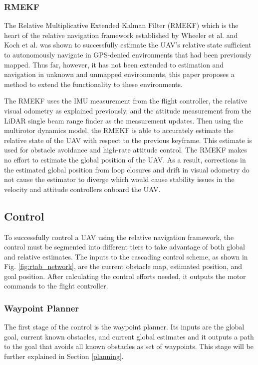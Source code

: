 \documentclass[letterpaper, 10 pt, conference]{ieeeconf}  %
\begin{document}
\subsubsection{RMEKF}

The Relative Multiplicative Extended Kalman Filter (RMEKF) which is the heart of the relative navigation framework established by Wheeler et al. \cite{Wheeler2017}\cite{Wheeler2018} and Koch et al. \cite{Koch2017} was shown to successfully estimate the UAV's relative state sufficient to autonomously navigate in GPS-denied environments that had been previously mapped. Thus far, however, it has not been extended to estimation and navigation in unknown and unmapped environments, this paper proposes a method to extend the functionality to these environments.

The RMEKF uses the IMU measurement from the flight controller, the relative visual odometry as explained previously, and the attitude measurement from the LiDAR single beam range finder as the measurement updates. Then using the multirotor dynamics model, the RMEKF is able to accurately estimate the relative state of the UAV with respect to the previous keyframe. This estimate is used for obstacle avoidance and high-rate attitude control. The RMEKF makes no effort to estimate the global position of the UAV. As a result, corrections in the estimated global position from loop closures and drift in visual odometry do not cause the estimator to diverge which would cause stability issues in the velocity and attitude controllers onboard the UAV.

\subsection{Control}

To successfully control a UAV using the relative navigation framework, the control must be segmented into different tiers to take advantage of both global and relative estimates. The inputs to the cascading control scheme, as shown in Fig. \ref{fig:rtab_network}, are the current obstacle map, estimated position, and goal position. After calculating the control efforts needed, it outputs the motor commands to the flight controller.

\subsubsection{Waypoint Planner}

The first stage of the control is the waypoint planner. Its inputs are the global goal, current known obstacles, and current global estimates and it outputs a path to the goal that avoids all known obstacles as set of waypoints. This stage will be further explained in Section \ref{planning}.
\end{document}
